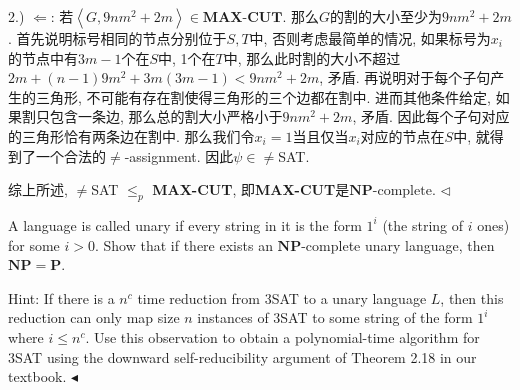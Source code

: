 \documentclass[11pt]{article}
\newcommand{\mP}{\mathbf{P}}
\newcommand{\NP}{\mathbf{NP}}
\newcommand{\NPC}{\mathbf{NP}\text{-complete}}
\newcommand{\1}{\mathbf{1}}
\newenvironment{problem}[2][Problem]{\begin{trivlist}
\item[\hskip \labelsep{\bfseries#1}\hskip\labelsep{\bfseries#2.}]}{\hfill$\blacktriangleleft$\end{trivlist}}
\newenvironment{answer}[1][Answer]{\begin{trivlist}
\item[\hskip \labelsep{\bfseries\itshape#1.}\hskip \labelsep]}{\hfill$\lhd$\end{trivlist}}
\begin{document}
\begin{answer}
    2.) $\Leftarrow$: 若$\left\langle G, 9nm^2+2m \right\rangle \in \textbf{MAX-CUT}$. 那么$G$的割的大小至少为$9nm^2 + 2m$. 首先说明标号相同的节点分别位于$S,T$中, 否则考虑最简单的情况, 如果标号为$x_i$的节点中有$3m-1$个在$S$中, 1个在$T$中, 那么此时割的大小不超过$2m + (n-1)9m^2 + 3m(3m-1) < 9nm^2+2m$, 矛盾. 再说明对于每个子句产生的三角形, 不可能有存在割使得三角形的三个边都在割中. 进而其他条件给定, 如果割只包含一条边, 那么总的割大小严格小于$9nm^2+2m$, 矛盾. 因此每个子句对应的三角形恰有两条边在割中. 那么我们令$x_i = 1$当且仅当$x_i$对应的节点在$S$中, 就得到了一个合法的$\neq$-assignment. 因此$\psi \in \neq$SAT.  

    综上所述, $\neq$SAT $\le_p$ \textbf{MAX-CUT}, 即\textbf{MAX-CUT}是$\NPC$.
\end{answer}
\begin{problem}{2.(16 points)}
    A language is called unary if every string in it is the form $1^i$ (the string of $i$ ones) for some $i > 0$. Show that if there exists an $\NP$-complete unary language, then $\NP = \mP$. 
    
    Hint: If there is a $n^c$ time reduction from 3SAT to a unary language $L$, then this reduction can only map size $n$ instances of 3SAT to some string of the form $1^i$ where $i \le n^c$. Use this observation to obtain a polynomial-time algorithm for 3SAT using the downward self-reducibility argument of Theorem 2.18 in our textbook.
\end{problem}
\end{document}
